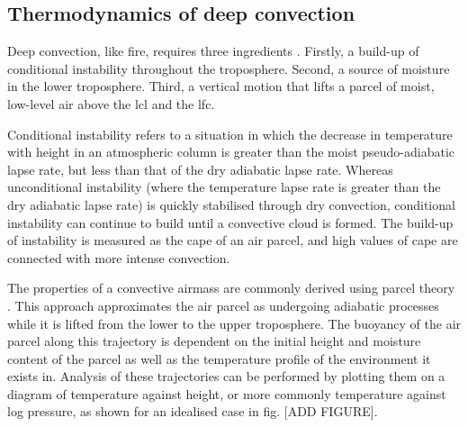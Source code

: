 \subsection{Thermodynamics of deep convection}

Deep convection, like fire, requires three ingredients \citep{brooks_century_2019}. 
Firstly, a build-up of conditional instability throughout the troposphere. 
Second, a source of moisture in the lower troposphere. 
Third, a vertical motion that lifts a parcel of moist, low-level air above the \acrfull{lcl} and the \acrfull{lfc}.

Conditional instability refers to a situation in which the decrease in temperature with height in an atmospheric column is greater than the moist pseudo-adiabatic lapse rate, but less than that of the dry adiabatic lapse rate. 
Whereas unconditional instability (where the temperature lapse rate is greater than the dry adiabatic lapse rate) is quickly stabilised through dry convection, conditional instability can continue to build until a convective cloud is formed. 
The build-up of instability is measured as the \acrfull{cape} of an air parcel, and high values of \acrshort{cape} are connected with more intense convection.

The properties of a convective airmass are commonly derived using parcel theory \citep{stull_practical_2016}. 
This approach approximates the air parcel as undergoing adiabatic processes while it is lifted from the lower to the upper troposphere. 
The buoyancy of the air parcel along this trajectory is dependent on the initial height and moisture content of the parcel as well as the temperature profile of the environment it exists in. 
Analysis of these trajectories can be performed by plotting them on a diagram of temperature against height, or more commonly temperature against log pressure, as shown for an idealised case in fig. [ADD FIGURE].

